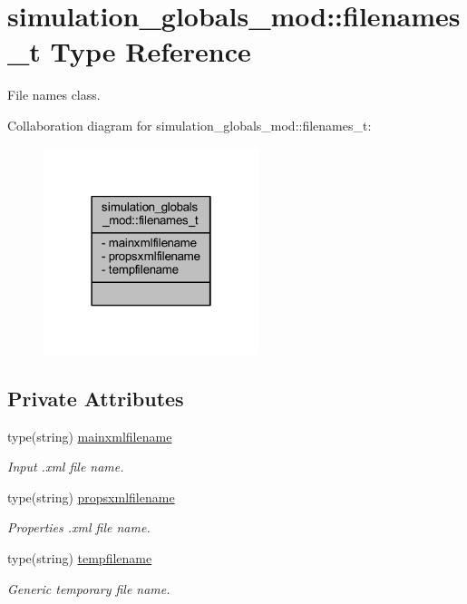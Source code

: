 \hypertarget{structsimulation__globals__mod_1_1filenames__t}{}\section{simulation\+\_\+globals\+\_\+mod\+:\+:filenames\+\_\+t Type Reference}
\label{structsimulation__globals__mod_1_1filenames__t}


File names class.  




Collaboration diagram for simulation\+\_\+globals\+\_\+mod\+:\+:filenames\+\_\+t\+:\nopagebreak
\begin{figure}[H]
\begin{center}
\leavevmode
\includegraphics[width=178pt]{structsimulation__globals__mod_1_1filenames__t__coll__graph}
\end{center}
\end{figure}
\subsection*{Private Attributes}
\begin{DoxyCompactItemize}
\item 
type(string) \mbox{\hyperlink{structsimulation__globals__mod_1_1filenames__t_af3e0ecdd0ab881ea2c2dd0a430d99d93}{mainxmlfilename}}
\begin{DoxyCompactList}\small\item\em Input .xml file name. \end{DoxyCompactList}\item 
type(string) \mbox{\hyperlink{structsimulation__globals__mod_1_1filenames__t_ae9790bc76014d831bfad281ab63e6f4c}{propsxmlfilename}}
\begin{DoxyCompactList}\small\item\em Properties .xml file name. \end{DoxyCompactList}\item 
type(string) \mbox{\hyperlink{structsimulation__globals__mod_1_1filenames__t_a207bede622cac14f7baef87cf0c000b7}{tempfilename}}
\begin{DoxyCompactList}\small\item\em Generic temporary file name. \end{DoxyCompactList}\end{DoxyCompactItemize}


